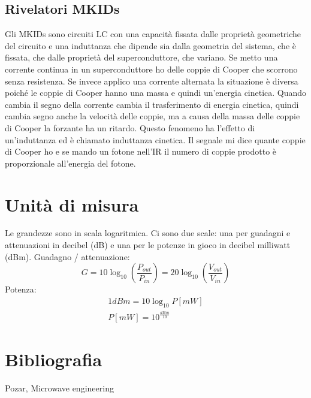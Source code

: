 \documentclass{article}
\begin{document}
\subsection{Rivelatori MKIDs}
Gli MKIDs sono circuiti LC con una capacità fissata dalle proprietà geometriche del circuito e una induttanza che dipende sia dalla geometria del sistema, che è fissata, che dalle proprietà del superconduttore, che variano.
Se metto una corrente continua in un superconduttore ho delle coppie di Cooper che scorrono senza resistenza.
Se invece applico una corrente alternata la situazione è diversa poiché le coppie di Cooper hanno una massa e quindi un'energia cinetica.
Quando cambia il segno della corrente cambia il trasferimento di energia cinetica, quindi cambia segno anche la velocità delle coppie, ma a causa della massa delle coppie di Cooper la forzante ha un ritardo. 
Questo fenomeno ha l'effetto di un'induttanza ed è chiamato induttanza cinetica. 
Il segnale mi dice quante coppie di Cooper ho e se mando un fotone nell'IR il numero di coppie prodotto è proporzionale all'energia del fotone.

\section{Unità di misura}
Le grandezze sono in scala logaritmica. 
Ci sono due scale: una per guadagni e attenuazioni in decibel (dB) e una per le potenze in gioco in decibel milliwatt (dBm).
Guadagno / attenuazione: 
\begin{equation}
    G = 10 \log_{10}\left(\frac{P_{out}}{P_{in}}\right) = 20 \log_{10}\left(\frac{V_{out}}{V_{in}}\right)
\end{equation}
Potenza:
\begin{align*}
    1 dBm = 10 \log_{10} P[mW]\\
    P[mW] = 10^{\frac{dBm}{10}}
\end{align*}

\section{Bibliografia}
Pozar, Microwave engineering
\end{document}
